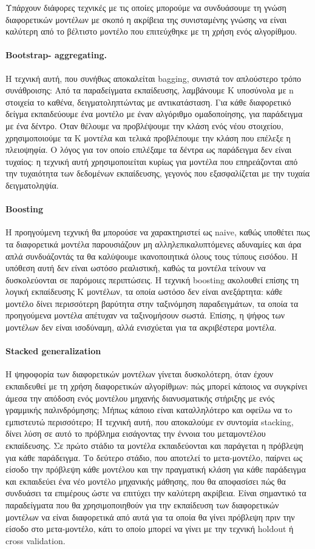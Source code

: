 Υπάρχουν διάφορες τεχνικές με τις οποίες μπορούμε να συνδυάσουμε τη γνώση διαφορετικών μοντέλων με σκοπό η ακρίβεια της συνισταμένης γνώσης να είναι καλύτερη από το βέλτιστο μοντέλο που επιτεύχθηκε με τη χρήση ενός αλγορίθμου.

\paragraph{Bootstrap- aggregating.}Η τεχνική αυτή, που συνήθως αποκαλείται bagging, συνιστά τον απλούστερο τρόπο συνάθροισης: Από τα παραδείγματα εκπαίδευσης, λαμβάνουμε Κ υποσύνολα με n στοιχεία το καθένα, δειγματοληπτώντας με αντικατάσταση. Για κάθε διαφορετικό δείγμα εκπαιδεύουμε ένα μοντέλο με έναν αλγόριθμο ομαδοποίησης, για παράδειγμα με ένα δέντρο. Όταν θέλουμε να προβλέψουμε την κλάση ενός νέου στοιχείου, χρησιμοποιούμε τα Κ μοντέλα και τελικά προβλέπουμε την κλάση που επέλεξε η πλειοψηφία. Ο λόγος για τον οποίο επιλέξαμε τα δέντρα ως παράδειγμα δεν είναι τυχαίος: η τεχνική αυτή χρησιμοποιείται κυρίως για μοντέλα που επηρεάζονται από την τυχαιότητα των δεδομένων εκπαίδευσης, γεγονός που εξασφαλίζεται με την τυχαία δειγματοληψία.

\paragraph{Boosting} Η προηγούμενη τεχνική θα μπορούσε να χαρακτηριστεί ως naive, καθώς υποθέτει πως τα διαφορετικά μοντέλα παρουσιάζουν μη αλληλεπικαλυπτόμενες αδυναμίες και άρα απλά συνδυάζοντάς τα θα καλύψουμε ικανοποιητικά όλους τους τύπους εισόδου. Η υπόθεση αυτή δεν είναι ωστόσο ρεαλιστική, καθώς τα μοντέλα τείνουν να δυσκολεύονται σε παρόμοιες περιπτώσεις. Η τεχνική boosting ακολουθεί επίσης τη λογική εκπαίδευσης Κ μοντέλων, τα οποία ωστόσο δεν είναι ανεξάρτητα: κάθε μοντέλο δίνει περισσότερη βαρύτητα στην ταξινόμηση παραδειγμάτων, τα οποία τα προηγούμενα μοντέλα απέτυχαν να ταξινομήσουν σωστά. Επίσης, η ψήφος των μοντέλων δεν είναι ισοδύναμη, αλλά ενισχύεται για τα ακριβέστερα μοντέλα.
\paragraph{Stacked generalization} Η ψηφοφορία των διαφορετικών μοντέλων γίνεται δυσκολότερη, όταν έχουν εκπαιδευθεί με τη χρήση διαφορετικών αλγορίθμων: πώς μπορεί κάποιος να συγκρίνει άμεσα την απόδοση ενός μοντέλου μηχανής διανυσματικής στήριξης με ενός γραμμικής παλινδρόμησης; Μήπως κάποιο είναι καταλληλότερο και οφείλω να τo εμπιστευτώ περισσότερο; Η τεχνική αυτή, που αποκαλούμε εν συντομία stacking, δίνει λύση σε αυτό το πρόβλημα εισάγοντας την έννοια του μεταμοντέλου εκπαίδευσης. Σε πρώτο στάδιο τα μοντέλα εκπαιδεύονται και παράγεται η πρόβλεψη για κάθε παράδειγμα. Το δεύτερο στάδιο, που αποτελεί το μετα-μοντέλο, παίρνει ως είσοδο την πρόβλεψη κάθε μοντέλου και την πραγματική
κλάση για κάθε παράδειγμα και εκπαιδεύει ένα νέο μοντέλο μηχανικής μάθησης, που θα αποφασίσει πώς θα συνδυάσει τα επιμέρους ώστε να επιτύχει την καλύτερη ακρίβεια. Είναι σημαντικό τα παραδείγματα που θα χρησιμοποιηθούν για την εκπαίδευση των διαφορετικών μοντέλων να είναι διαφορετικά από αυτά για τα οποία θα γίνει πρόβλεψη πριν την είσοδο στο μετα-μοντέλο, κάτι το οποίο μπορεί να γίνει με την τεχνική holdout ή cross validation.
